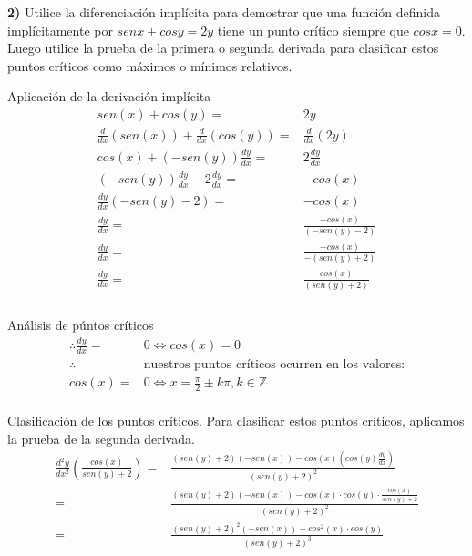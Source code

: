 \textbf{2)} Utilice la diferenciación implícita para demostrar que una función definida implícitamente por $sen x + cos y = 2y$ tiene un punto crítico siempre que $cos x = 0$. Luego utilice la prueba de la primera o segunda derivada para clasificar estos puntos críticos como máximos o mínimos relativos.

\begin{multicols}{2}
	\noindent
	Aplicación de la derivación implícita
	\begin{align*}
		sen (x)+cos(y)=                                                   & 2y                                      \\
		\frac{d}{dx}\left(sen (x)\right)+\frac{d}{dx}\left(cos(y)\right)= & \frac{d}{dx}\left(2y\right)             \\
		cos (x)+\left(-sen(y)\right)\frac{dy}{dx}=                        & 2\frac{dy}{dx}                          \\
		\left(-sen(y)\right)\frac{dy}{dx}-2\frac{dy}{dx}=                 & -cos (x)                                \\
		\frac{dy}{dx}\left(-sen(y)-2\right)=                              & -cos (x)                                \\
		\frac{dy}{dx}=                                                    & \frac{-cos (x)}{\left(-sen(y)-2\right)} \\
		\frac{dy}{dx}=                                                    & \frac{-cos (x)}{-\left(sen(y)+2\right)} \\
		\frac{dy}{dx}=                                                    & \frac{cos (x)}{\left(sen(y)+2\right)}   \\
	\end{align*}
	\columnbreak\\
	Análisis de púntos críticos
	\begin{align*}
		\therefore \frac{dy}{dx}= & 0\iff cos(x)=0                                          \\
		\therefore                & \text{nuestros puntos críticos ocurren en los valores:} \\
		cos(x)=                   & 0\iff x=\frac{\pi}{2}\pm k\pi, k\in\mathbb{Z}           \\
	\end{align*}
\end{multicols}
\noindent
Clasificación de los puntos críticos. Para clasificar estos puntos críticos, aplicamos la prueba de la segunda derivada.
\begin{align*}
	\frac{d^2y}{dx^2}\left(\frac{cos (x)}{sen(y)+2}\right)= & \frac{(sen(y)+2)\left(-sen(x)\right)-cos(x)\left(cos(y)\frac{dy}{dx}\right)}{\left(sen(y)+2\right)^2}         \\
	=                                                       & \frac{(sen(y)+2)\left(-sen(x)\right)-cos(x)\cdot cos(y)\cdot\frac{cos(x)}{sen(y)+2}}{\left(sen(y)+2\right)^2} \\
	=                                                       & \frac{(sen(y)+2)^2\left(-sen(x)\right)-cos^2(x)\cdot cos(y)}{\left(sen(y)+2\right)^3}
\end{align*}
